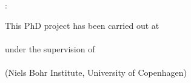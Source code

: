
\vspace*{\fill}

\makeatletter
\theauthor: \work{\@title\ --- \@subtitle}
\makeatother

\vspace{2ex}

\noindent This PhD project has been carried out at\\[.8em]
\\[.8em]
under the supervision of\\[.8em]
\\ (Niels Bohr Institute, University of Copenhagen)

\vspace{3em}

{\color{largeornament}}

\cleardoublepage
